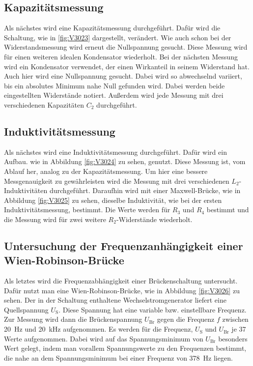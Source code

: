 \documentclass[
  bibliography=totoc,     %
  captions=tableheading,  %
  titlepage=firstiscover, %
]{scrartcl}
\begin{document}
\subsection{Kapazitätsmessung}
Als nächstes wird eine Kapazitätsmessung durchgeführt. Dafür wird die Schaltung,
wie in \ref{fig:V3023} dargestellt, verändert. Wie auch schon bei der
Widerstandsmessung wird erneut die Nullspannung gesucht. Diese Messung wird
für einen weiteren idealen Kondensator wiederholt. Bei der nächsten Messung wird ein Kondensator
verwendet, der einen Wirkanteil in seinem Widerstand hat. Auch hier
wird eine Nullspannung gesucht. Dabei wird so abwechselnd variiert, bis ein
absolutes Minimum nahe Null gefunden wird. Dabei werden beide eingestellten
Widerstände notiert. Außerdem wird jede Messung mit drei verschiedenen
Kapazitäten $C_2$ durchgeführt.
\newpage
\subsection{Induktivitätsmessung}
Als nächstes wird eine Induktivitätsmessung durchgeführt. Dafür wird ein Aufbau.
wie in Abbildung \ref{fig:V3024} zu sehen, genutzt. Diese Messung
ist, vom Ablauf her, analog zu der Kapazitätsmessung. Um hier eine bessere
Messgenauigkeit zu gewährleisten wird die Messung mit drei verschiedenen
$L_2$-Induktivitäten durchgeführt.
Daraufhin wird mit einer Maxwell-Brücke, wie in Abbildung \ref{fig:V3025} zu
sehen, dieselbe Induktivität, wie bei der ersten Induktivitätsmessung,
bestimmt. Die Werte werden für $R_3$ und $R_4$ bestimmt und die Messung wird
für zwei weitere $R_2$-Widerstände wiederholt.

\subsection{Untersuchung der Frequenzanhängigkeit einer Wien-Robinson-Brücke}
Als letztes wird die Frequenzabhängigkeit einer Brückenschaltung untersucht.
Dafür nutzt man eine Wien-Robinson-Brücke, wie in Abbildung \ref{fig:V3026}
zu sehen. Der in der Schaltung enthaltene Wechselstromgenerator liefert eine
Quellspannung $U_\mathup{S}$. Diese Spannung hat eine variable bzw.
einstellbare Frequenz. Zur Messung wird dann die Brückenspannung $U_\mathup{Br}$ gegen die
Frequenz $f$ zwischen \SI{20}{\hertz} und \SI{20}{\kilo\hertz}
aufgenommen. Es werden für die Frequenz, $U_\mathup{S}$ und $U_\mathup{Br}$ je 37 Werte aufgenommen.
Dabei wird auf das Spannungsminimum von $U_\mathup{Br}$ besonders Wert gelegt, indem man
vorallem Spannungswerte zu den Frequenzen bestimmt, die nahe an dem
Spannungsminimum bei einer Frequenz von \SI{378}{\hertz} liegen.
\newpage
\end{document}
